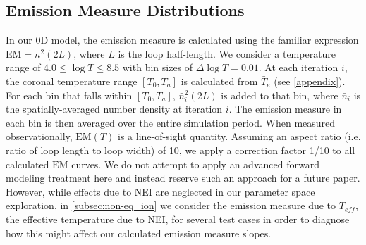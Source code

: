\documentclass[apj]{emulateapj}
\begin{document}
	\subsection{Emission Measure Distributions}
	\label{subsec:em_dist}
	\par In our 0D model, the emission measure is calculated using the familiar expression $\mathrm{EM}=n^2(2L)$, where $L$ is the loop half-length. We consider a temperature range of $4.0\le\log{T}\le8.5$ with bin sizes of $\Delta\log{T}=0.01$. At each iteration $i$, the coronal temperature range $[T_0,T_a]$ is calculated from $\bar{T}_e$ (see \autoref{appendix}). For each bin that falls within $[T_0,T_a]$, $\bar{n}_i^2(2L)$ is added to that bin, where $\bar{n}_i$ is the spatially-averaged number density at iteration $i$. The emission measure in each bin is then averaged over the entire simulation period. When measured observationally, $\mathrm{EM}(T)$ is a line-of-sight quantity. Assuming an aspect ratio (i.e. ratio of loop length to loop width) of 10, we apply a correction factor 1/10 to all calculated $\mathrm{EM}$ curves. We do not attempt to apply an advanced forward modeling treatment here and instead reserve such an approach for a future paper. However, while effects due to NEI are neglected in our parameter space exploration, in \autoref{subsec:non-eq_ion} we consider the emission measure due to $T_{eff}$, the effective temperature due to NEI, for several test cases in order to diagnose how this might affect our calculated emission measure slopes.
\end{document}
